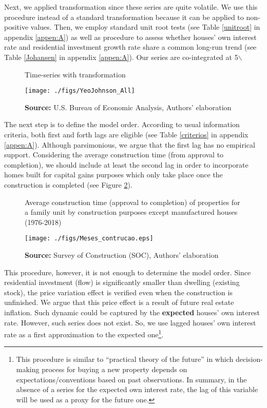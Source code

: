 \documentclass[11pt]{article}
\begin{document}
Next, we applied \textcite{yeo_new_2000} transformation since these series are quite volatile. We use this procedure instead of a standard \textcite{box_analysis_1964} transformation  because it can be applied to non-positive values. 
Then, we employ standard unit root tests (see Table \ref{unitroot} in appendix \ref{appen:A}) as well as \textcite{johansen_estimation_1991} procedure to assess whether houses' own interest rate and residential investment growth rate share a common long-run trend (see Table \ref{Johansen} in appendix \ref{appen:A}).
Our series are co-integrated at 5$\backslash$%

\begin{figure}[htb]
	\centering
	\caption{Time-series with \textcite{yeo_new_2000} transformation}
	\label{YeoJhonson}
	\texttt{[image: ./figs/YeoJohnson\_All]}
	\caption*{\textbf{Source:} U.S. Bureau of Economic Analysis, Authors' elaboration}
\end{figure}




The next step is to define the model order. According to usual information criteria, both first and forth lags are eligible (see Table \ref{criterios} in appendix \ref{appen:A}).
Although parsimonious, we argue that the first lag has no empirical support.
Considering the average construction time (from approval to completion), we should include at least the second lag in order to incorporate homes built for capital gains purposes which only take place once the construction is completed (see Figure \ref{meses}).

\begin{figure}[H]
	\centering
	\caption{Average construction time (approval to completion) of properties for a family unit by construction purposes except manufactured houses (1976-2018)}
	\label{meses}
	\texttt{[image: ./figs/Meses\_contrucao.eps]}
	\caption*{\textbf{Source:} Survey of Construction (SOC), Authors' elaboration}
\end{figure}

This procedure, however, it is not enough to determine the model order. 
Since residential investment (flow) is significantly smaller than dwelling (existing stock), the price variation effect  is verified even when the construction is unfinished. 
We argue that this price effect is a result of future real estate inflation.
Such dynamic could be captured by the \textbf{expected} houses' own interest rate.
However, such series does not exist. So, we use lagged houses' own interest rate as a first approximation to the expected one\footnote{This procedure is similar to \textcite{keynes_general_1937} ``practical theory of the future'' in which decision-making process for buying a new property depends on expectations/conventions based on past observations. 
In summary, in the absence of a series for the expected own interest rate, the lag of this variable will be used as a proxy for the future one.}.
\end{document}
